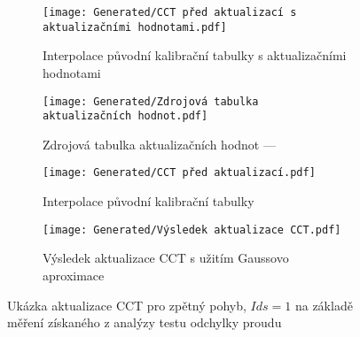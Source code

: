 \begin{landscapeimagepage}
    \begin{figure}[H]
        \centering
        \begin{subfigure}{.5\textheight}
            \centering
            \texttt{[image: Generated/CCT před aktualizací s aktualizačními hodnotami.pdf]}
            \caption{Interpolace původní kalibrační tabulky s aktualizačními hodnotami}
            \label{fig:Původní kalibrační tabulka s aktualizačními hodnotami}
        \end{subfigure}
        \vspace{0.5cm}
        \hspace{2.5cm}
        \begin{subfigure}{.5\textheight}
            \centering
            \texttt{[image: Generated/Zdrojová tabulka aktualizačních hodnot.pdf]}
            \caption{Zdrojová tabulka aktualizačních hodnot --- }
            \label{fig:Zdrojová tabulka aktualizačních hodnot}
        \end{subfigure}
        \vspace{0.5cm}
        \begin{subfigure}{.5\textheight}
            \centering
            \texttt{[image: Generated/CCT před aktualizací.pdf]}
            \caption{Interpolace původní kalibrační tabulky}
            \label{fig:Interpolace původní kalibrační tabulky}
        \end{subfigure}
        \hspace{2.5cm}
        \begin{subfigure}{.5\textheight}
            \centering
            \texttt{[image: Generated/Výsledek aktualizace CCT.pdf]}
            \caption{Výsledek aktualizace CCT s užitím Gaussovo aproximace}
            \label{fig:Výsledek aktualizace CCT s užitím Gaussovo aproximace}
        \end{subfigure}
        \caption{Ukázka aktualizace CCT pro zpětný pohyb, $Ids = 1$ na základě měření získaného z analýzy testu odchylky proudu}
        \label{fig:Ukázka aktualizace CCT na základě měření získaného z analýzy testu odchylky proudu}
    \end{figure}
\end{landscapeimagepage}